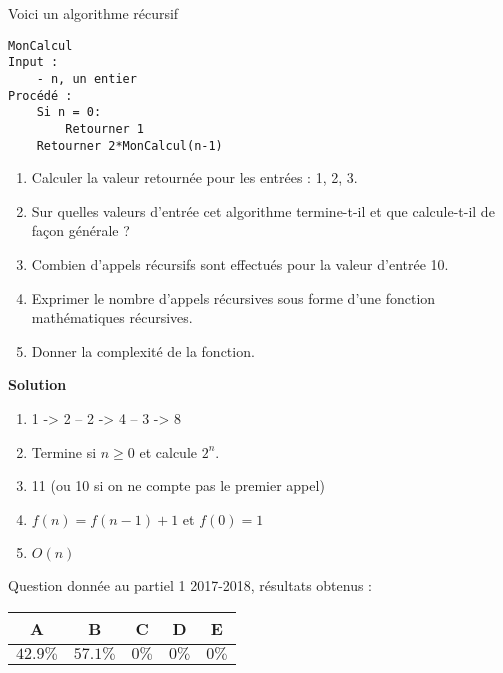 
\begin{exercice}[Partiel 2017-18]
Voici un algorithme récursif

\begin{lstlisting}
MonCalcul
Input :
    - n, un entier
Procédé :
    Si n = 0:
        Retourner 1
    Retourner 2*MonCalcul(n-1)
\end{lstlisting}

\begin{enumerate}
\item Calculer la valeur retournée pour les entrées : 1, 2, 3.
\item Sur quelles valeurs d'entrée cet algorithme termine-t-il et que calcule-t-il de façon générale ?
\item Combien d'appels récursifs sont effectués pour la valeur d'entrée 10.
\item Exprimer le nombre d'appels récursives sous forme d'une fonction mathématiques récursives.
\item Donner la complexité de la fonction.
\end{enumerate}

\textbf{Solution}

\begin{enumerate}
\item 1 -> 2 -- 2 -> 4 -- 3 -> 8
\item Termine si $n \geq 0$ et calcule $2^n$.
\item 11 (ou 10 si on ne compte pas le premier appel)
\item $f(n) = f(n-1) + 1$ et $f(0) = 1$
\item $O(n)$
\end{enumerate}

Question donnée au partiel 1 2017-2018, résultats obtenus :

\vspace{0.5cm}

\begin{tabular}{|c|c|c|c|c|}
\hline
A & B & C & D & E \\ \hline
$42.9\%$ & $57.1\%$ & $0\%$ & $0\%$ & $0\%$ \\ \hline
\end{tabular} 
\end{exercice}